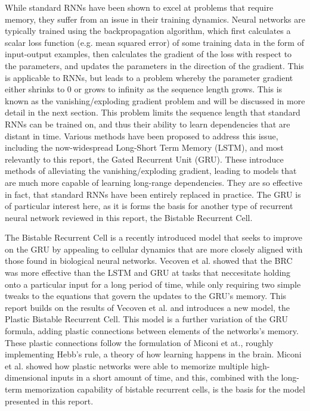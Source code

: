 While standard RNNs have been shown to excel at problems that require memory, they suffer from an issue in their training dynamics.
Neural networks are typically trained using the backpropagation algorithm, which first calculates a scalar loss function (e.g. mean squared error) of some training data in the form of input-output examples, then calculates the gradient of the loss with respect to the parameters, and updates the parameters in the direction of the gradient. This is applicable to RNNs, but leads to a problem whereby the parameter gradient either shrinks to 0 or grows to infinity as the sequence length grows. This is known as the vanishing/exploding gradient problem and will be discussed in more detail in the next section. This problem limits the sequence length that standard RNNs can be trained on, and thus their ability to learn dependencies that are distant in time.
Various methods have been proposed to address this issue, including the now-widespread Long-Short Term Memory\cite{hochreiter1997lstm} (LSTM), and most relevantly to this report, the Gated Recurrent Unit\cite{cho2014gru} (GRU). These introduce methods of alleviating the vanishing/exploding gradient, leading to models that are much more capable of learning long-range dependencies. They are so effective in fact, that standard RNNs have been entirely replaced in practice. The GRU is of particular interest here, as it is forms the basis for another type of recurrent neural network reviewed in this report, the Bistable Recurrent Cell\cite{vecoven2021brc}.

The Bistable Recurrent Cell is a recently introduced model that seeks to improve on the GRU by appealing to cellular dynamics that are more closely aligned with those found in biological neural networks. Vecoven et al.\cite{vecoven2021brc} showed that the BRC was more effective than the LSTM and GRU at tasks that neccesitate holding onto a particular input for a long period of time, while only requiring two simple tweaks to the equations that govern the updates to the GRU's memory.
This report builds on the results of Vecoven et al.\cite{vecoven2021brc} and introduces a new model, the Plastic Bistable Recurrent Cell. This model is a further variation of the GRU formula, adding plastic connections between elements of the networks's memory. These plastic connections follow the formulation of Miconi et at.\cite{miconi2018diffplas}, roughly implementing Hebb's rule, a theory of how learning happens in the brain. Miconi et al. showed how plastic networks were able to memorize multiple high-dimensional inputs in a short amount of time, and this, combined with the long-term memorization capability of bistable recurrent cells, is the basis for the model presented in this report.